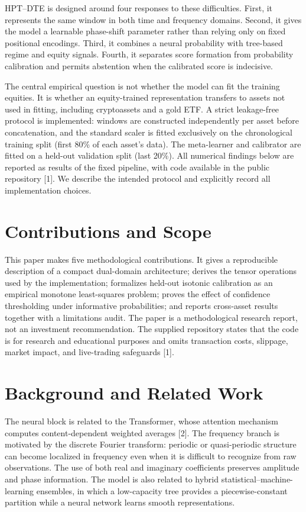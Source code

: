 \documentclass[11pt]{article}
\begin{document}
HPT--DTE is designed around four responses to these difficulties. First, it represents the same window in both time and frequency domains. Second, it gives the model a learnable phase-shift parameter rather than relying only on fixed positional encodings. Third, it combines a neural probability with tree-based regime and equity signals. Fourth, it separates score formation from probability calibration and permits abstention when the calibrated score is indecisive.

The central empirical question is not whether the model can fit the training equities. It is whether an equity-trained representation transfers to assets not used in fitting, including cryptoassets and a gold ETF. A strict leakage-free protocol is implemented: windows are constructed independently per asset before concatenation, and the standard scaler is fitted exclusively on the chronological training split (first 80\% of each asset's data). The meta-learner and calibrator are fitted on a held-out validation split (last 20\%). All numerical findings below are reported as results of the fixed pipeline, with code available in the public repository [1]. We describe the intended protocol and explicitly record all implementation choices.

\section{Contributions and Scope}
This paper makes five methodological contributions. It gives a reproducible description of a compact dual-domain architecture; derives the tensor operations used by the implementation; formalizes held-out isotonic calibration as an empirical monotone least-squares problem; proves the effect of confidence thresholding under informative probabilities; and reports cross-asset results together with a limitations audit. The paper is a methodological research report, not an investment recommendation. The supplied repository states that the code is for research and educational purposes and omits transaction costs, slippage, market impact, and live-trading safeguards [1].

\section{Background and Related Work}
The neural block is related to the Transformer, whose attention mechanism computes content-dependent weighted averages [2]. The frequency branch is motivated by the discrete Fourier transform: periodic or quasi-periodic structure can become localized in frequency even when it is difficult to recognize from raw observations. The use of both real and imaginary coefficients preserves amplitude and phase information. The model is also related to hybrid statistical--machine-learning ensembles, in which a low-capacity tree provides a piecewise-constant partition while a neural network learns smooth representations.
\end{document}
